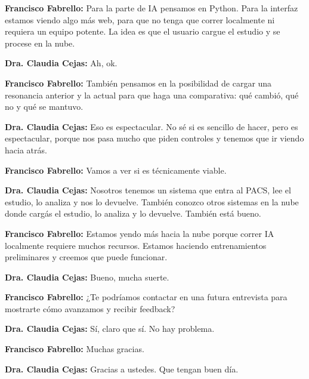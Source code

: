 \noindent\textbf{Francisco Fabrello:} Para la parte de IA pensamos en Python. Para la interfaz estamos viendo algo más web, para que no tenga que correr localmente ni requiera un equipo potente. La idea es que el usuario cargue el estudio y se procese en la nube.

\noindent\textbf{Dra. Claudia Cejas:} Ah, ok.

\noindent\textbf{Francisco Fabrello:} También pensamos en la posibilidad de cargar una resonancia anterior y la actual para que haga una comparativa: qué cambió, qué no y qué se mantuvo.

\noindent\textbf{Dra. Claudia Cejas:} Eso es espectacular. No sé si es sencillo de hacer, pero es espectacular, porque nos pasa mucho que piden controles y tenemos que ir viendo hacia atrás.

\noindent\textbf{Francisco Fabrello:} Vamos a ver si es técnicamente viable.

\noindent\textbf{Dra. Claudia Cejas:} Nosotros tenemos un sistema que entra al PACS, lee el estudio, lo analiza y nos lo devuelve. También conozco otros sistemas en la nube donde cargás el estudio, lo analiza y lo devuelve. También está bueno.

\noindent\textbf{Francisco Fabrello:} Estamos yendo más hacia la nube porque correr IA localmente requiere muchos recursos. Estamos haciendo entrenamientos preliminares y creemos que puede funcionar.

\noindent\textbf{Dra. Claudia Cejas:} Bueno, mucha suerte.

\noindent\textbf{Francisco Fabrello:} ¿Te podríamos contactar en una futura entrevista para mostrarte cómo avanzamos y recibir feedback?

\noindent\textbf{Dra. Claudia Cejas:} Sí, claro que sí. No hay problema.

\noindent\textbf{Francisco Fabrello:} Muchas gracias.

\noindent\textbf{Dra. Claudia Cejas:} Gracias a ustedes. Que tengan buen día.
